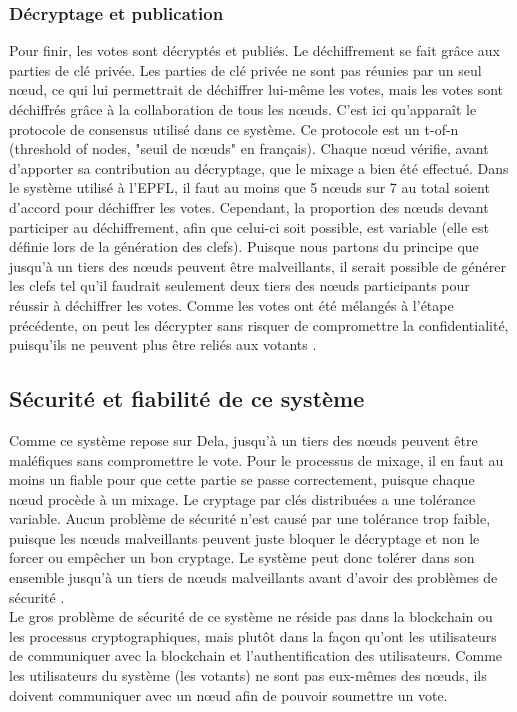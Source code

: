 \documentclass[10pt,a4paper,twoside]{article}
\numberwithin{equation}{section}
\begin{document}
		\subsubsection{Décryptage et publication}
			Pour finir, les votes sont décryptés et publiés. Le déchiffrement se fait grâce aux parties de clé privée. Les parties de clé privée ne sont pas réunies par un seul n\oe ud, ce qui lui permettrait de déchiffrer lui-même les votes, mais les votes sont déchiffrés grâce à la collaboration de tous les n\oe uds. C'est ici qu'apparaît le protocole de consensus utilisé dans ce système. Ce protocole est un t-of-n (threshold of nodes, "seuil de n\oe uds" en français). Chaque n\oe ud vérifie, avant d'apporter sa contribution au décryptage, que le mixage a bien été effectué. Dans le système utilisé à l'EPFL, il faut au moins que 5 n\oe uds sur 7 au total soient d'accord pour déchiffrer les votes. Cependant, la proportion des n\oe uds devant participer au déchiffrement, afin que celui-ci soit possible, est variable (elle est définie lors de la génération des clefs). Puisque nous partons du principe que jusqu'à un tiers des n\oe uds peuvent être malveillants, il serait possible de générer les clefs tel qu'il faudrait seulement deux tiers des n\oe uds participants pour réussir à déchiffrer les votes. Comme les votes ont été mélangés à l'étape précédente, on peut les décrypter sans risquer de compromettre la confidentialité, puisqu'ils ne peuvent plus être reliés aux votants \cite{evoting_dela} \cite{interview}.\\
			
		
	\subsection{Sécurité et fiabilité de ce système}
		Comme ce système repose sur Dela, jusqu'à un tiers des n\oe uds peuvent être maléfiques sans compromettre le vote. Pour le processus de mixage, il en faut au moins un fiable pour que cette partie se passe correctement, puisque chaque n\oe ud procède à un mixage. Le cryptage par clés distribuées a une tolérance variable. Aucun problème de sécurité n'est causé par une tolérance trop faible, puisque les n\oe uds malveillants peuvent juste bloquer le décryptage et non le forcer ou empêcher un bon cryptage. Le système peut donc tolérer dans son ensemble jusqu'à un tiers de n\oe uds malveillants avant d'avoir des problèmes de sécurité \cite{evoting_dela}.\\
		
		Le gros problème de sécurité de ce système ne réside pas dans la blockchain ou les processus cryptographiques, mais plutôt dans la façon qu'ont les utilisateurs de communiquer avec la blockchain et l'authentification des utilisateurs. Comme les utilisateurs du système (les votants) ne sont pas eux-mêmes des n\oe uds, ils doivent communiquer avec un n\oe ud afin de pouvoir soumettre un vote.
		
\end{document}
